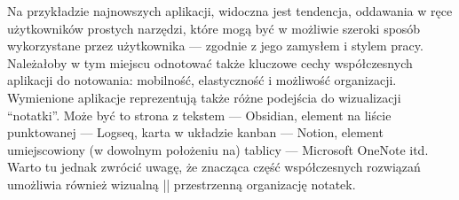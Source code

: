Na przykładzie najnowszych aplikacji, widoczna jest tendencja, oddawania w ręce użytkowników prostych narzędzi,
które mogą być w możliwie szeroki sposób wykorzystane przez użytkownika — zgodnie z jego zamysłem i stylem pracy.
Należałoby w tym miejscu odnotować także kluczowe cechy współczesnych aplikacji do notowania: mobilność, elastyczność
i możliwość organizacji.
Wymienione aplikacje reprezentują także różne podejścia do wizualizacji \enquote{notatki}.
Może być to strona z tekstem — Obsidian, element na liście punktowanej — Logseq, karta w układzie kanban — Notion,
element umiejscowiony (w dowolnym położeniu na) tablicy — Microsoft OneNote itd. Warto tu jednak zwrócić uwagę,
że znacząca część współczesnych rozwiązań umożliwia również wizualną || przestrzenną organizację notatek.
